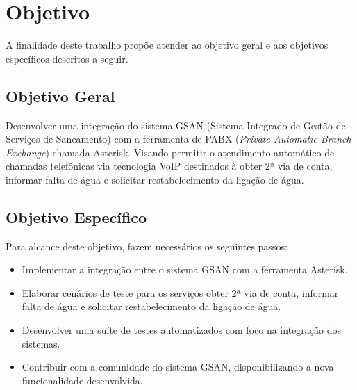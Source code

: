 \section*{Objetivo}

A finalidade deste trabalho propõe atender ao objetivo geral e aos objetivos específicos descritos a seguir.

\subsection*{Objetivo Geral}

Desenvolver uma integração do sistema GSAN (Sistema Integrado de Gestão de Serviços de Saneamento) com a ferramenta de PABX (\textit{Private Automatic Branch Exchange}) chamada Asterisk. Visando permitir o atendimento automático de chamadas telefônicas via tecnologia VoIP destinados à obter 2ª via de conta, informar falta de água e solicitar restabelecimento da ligação de água.

\subsection*{Objetivo Específico}
Para alcance deste objetivo, fazem necessários os seguintes passos:
\begin{itemize}
	\item Implementar a integração entre o sistema GSAN com a ferramenta Asterisk.
	\item Elaborar cenários de teste para os serviços obter 2ª via de conta, informar falta de água e solicitar restabelecimento da ligação de água.
	\item Desenvolver uma suíte de testes automatizados com foco na integração dos sistemas. 
	\item Contribuir com a comunidade do sistema GSAN, disponibilizando a nova funcionalidade desenvolvida.
\end{itemize}
